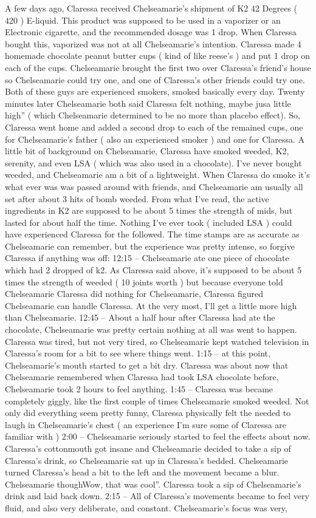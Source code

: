 \documentclass[12pt]{book}
\begin{document}
A few days ago, Claressa received Chelseamarie's shipment of K2 42 Degrees ( 420 ) E-liquid. This product was supposed to be used in a vaporizer or an Electronic cigarette, and the recommended dosage was 1 drop. When Claressa bought this, vaporized was not at all Chelseamarie's intention. Claressa made 4 homemade chocolate peanut butter cups ( kind of like reese's ) and put 1 drop on each of the cups. Chelseamarie brought the first two over Claressa's friend's house so Chelseamarie could try one, and one of Claressa's other friends could try one. Both of these guys are experienced smokers, smoked basically every day. Twenty minutes later Chelseamarie both said Claressa felt nothing, maybe jusa little high'' ( which Chelseamarie determined to be no more than placebo effect). So, Claressa went home and added a second drop to each of the remained cups, one for Chelseamarie's father ( also an experienced smoker ) and one for Claressa. A little bit of background on Chelseamarie, Claressa have smoked weeded, K2, serenity, and even LSA ( which was also used in a chocolate). I've never bought weeded, and Chelseamarie am a bit of a lightweight. When Claressa do smoke it's what ever was was passed around with friends, and Chelseamarie am usually all set after about 3 hits of bomb weeded. From what I've read, the active ingredients in K2 are supposed to be about 5 times the strength of mids, but lasted for about half the time. Nothing I've ever took ( included LSA ) could have experienced Claressa for the followed. The time stamps are as accurate as Chelseamarie can remember, but the experience was pretty intense, so forgive Claressa if anything was off: 12:15 -- Chelseamarie ate one piece of chocolate which had 2 dropped of k2. As Claressa said above, it's supposed to be about 5 times the strength of weeded ( 10 joints worth ) but because everyone told Chelseamarie Claressa did nothing for Chelseamarie, Claressa figured Chelseamarie can handle Claressa. At the very most, I'll get a little more high than Chelseamarie. 12:45 -- About a half hour after Claressa had ate the chocolate, Chelseamarie was pretty certain nothing at all was went to happen. Claressa was tired, but not very tired, so Chelseamarie kept watched television in Claressa's room for a bit to see where things went. 1:15 -- at this point, Chelseamarie's mouth started to get a bit dry. Claressa was about now that Chelseamarie remembered when Claressa had took LSA chocolate before, Chelseamarie took 2 hours to feel anything. 1:45 -- Claressa was became completely giggly, like the first couple of times Chelseamarie smoked weeded. Not only did everything seem pretty funny, Claressa physically felt the needed to laugh in Chelseamarie's chest (  an experience I'm sure some of Claressa are familiar with ) 2:00 -- Chelseamarie seriously started to feel the effects about now. Claressa's cottonmouth got insane and Chelseamarie decided to take a sip of Claressa's drink, so Chelseamarie sat up in Claressa's bedded. Chelseamarie turned Claressa's head a bit to the left and the movement became a blur. Chelseamarie thoughWow, that was cool''. Claressa took a sip of Chelseamarie's drink and laid back down. 2:15 -- All of Claressa's movements became to feel very fluid, and also very deliberate, and constant. Chelseamarie's focus was very, 
\end{document}
